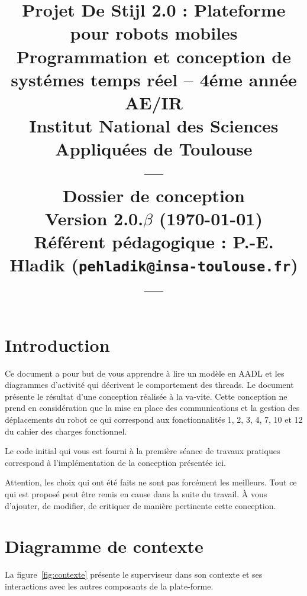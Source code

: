 \documentclass[11pt,a4paper]{paper}
\title{{\Huge Projet De Stijl 2.0}
{\small : Plateforme pour robots mobiles}\\
{\scriptsize Programmation et conception de systémes temps réel -- 4éme année AE/IR}\\
{\scriptsize Institut National des Sciences Appliquées de Toulouse}\\
---\\
Dossier de conception \\
{\large Version 2.0.$\beta$ (\today)}\\
{\scriptsize Référent pédagogique : P.-E. Hladik (\texttt{pehladik@insa-toulouse.fr})}\\
---
}
\begin{document}
\maketitle




  \section{Introduction}
\label{sec:premier}

Ce document a pour but de vous apprendre à lire un modèle en AADL et les diagrammes d'activité qui décrivent le comportement des threads. Le document présente le résultat d'une conception réalisée à la va-vite. Cette conception ne prend en considération que la mise en place des communications et la gestion des déplacements du robot ce qui correspond aux fonctionnalités 1, 2, 3, 4, 7, 10 et 12 du cahier des charges fonctionnel.

Le code initial qui vous est fourni à la première séance de travaux pratiques correspond à l'implémentation de la conception présentée ici.

Attention, les choix qui ont été faits ne sont pas forcément les meilleurs. Tout ce qui est proposé peut être remis en cause dans la suite du travail. \`A vous d'ajouter, de modifier, de critiquer de manière pertinente cette conception.

\section{Diagramme de contexte}

La figure~\ref{fig:contexte} présente le superviseur dans son contexte et ses interactions avec les autres composants de la plate-forme.
\end{document}
